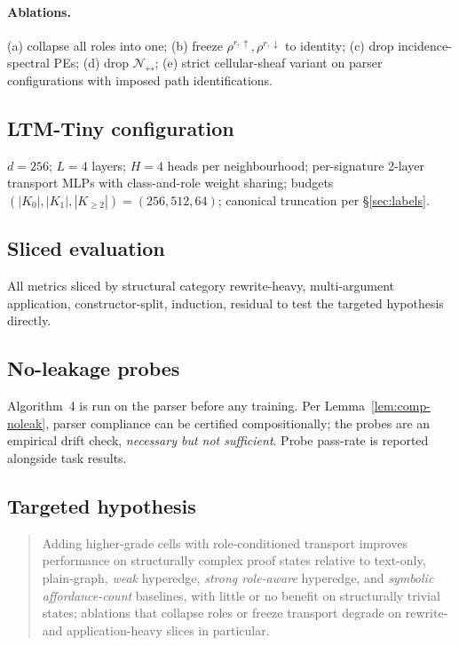 \documentclass[11pt]{article}
\theoremstyle{definition}
\theoremstyle{plain}
\begin{document}
\paragraph{Ablations.}
(a) collapse all roles into one;
(b) freeze $\rho^{r,\uparrow}, \rho^{r,\downarrow}$ to identity;
(c) drop incidence-spectral PEs;
(d) drop $\mathcal{N}_\leftrightarrow$;
(e) strict cellular-sheaf variant on parser configurations with imposed path identifications.

\subsection{LTM-Tiny configuration}

$d = 256$; $L = 4$ layers; $H = 4$ heads per neighbourhood; per-signature 2-layer transport MLPs with class-and-role weight sharing; budgets $(|K_0|, |K_1|, |K_{\ge 2}|) = (256, 512, 64)$; canonical truncation per \S\ref{sec:labels}.

\subsection{Sliced evaluation}

All metrics sliced by structural category rewrite-heavy, multi-argument application, constructor-split, induction, residual to test the targeted hypothesis directly.

\subsection{No-leakage probes}

Algorithm~4 is run on the parser before any training. Per Lemma~\ref{lem:comp-noleak}, parser compliance can be certified compositionally; the probes are an empirical drift check, \emph{necessary but not sufficient}. Probe pass-rate is reported alongside task results.

\subsection{Targeted hypothesis}

\begin{quote}
Adding higher-grade cells with role-conditioned transport improves performance on structurally complex proof states relative to text-only, plain-graph, \emph{weak} hyperedge, \emph{strong role-aware} hyperedge, and \emph{symbolic affordance-count} baselines, with little or no benefit on structurally trivial states; ablations that collapse roles or freeze transport degrade on rewrite- and application-heavy slices in particular.
\end{quote}
\end{document}

